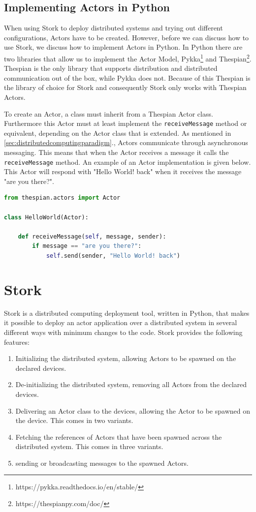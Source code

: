 \documentclass[a4paper]{article}
\newcommand{\secref}[1]{\autoref{#1}.}
\begin{document}
\subsection{Implementing Actors in Python}
When using Stork to deploy distributed systems and trying out different configurations, Actors have to be created. However, before we can discuss how to use Stork, we discuss how to implement Actors in Python. In Python there are two libraries that allow us to implement the Actor Model, Pykka\footnote{https://pykka.readthedocs.io/en/stable/} and Thespian\footnote{https://thespianpy.com/doc/}. Thespian is the only library that supports distribution and distributed communication out of the box, while Pykka does not. Because of this Thespian is the library of choice for Stork and consequently Stork only works with Thespian Actors. 

To create an Actor, a class must inherit from a Thespian Actor class. Furthermore this Actor must at least implement the \lstinline{receiveMessage} method or equivalent, depending on the Actor class that is extended. As mentioned in \secref{sec:distributedcomputingparadigm}, Actors communicate through asynchronous messaging. This means that when the Actor receives a message it calls the \lstinline{receiveMessage} method. An example of an Actor implementation is given below. This Actor will respond with "Hello World! back" when it receives the message "are you there?".
\begin{lstlisting}[language=Python, caption=Actor example, label=lst:actor]
from thespian.actors import Actor

class HelloWorld(Actor):

    def receiveMessage(self, message, sender):
        if message == "are you there?":
            self.send(sender, "Hello World! back")
\end{lstlisting}
\section{Stork}
Stork is a distributed computing deployment tool, written in Python, that makes it possible to deploy an actor application over a distributed system in several different ways with minimum changes to the code. Stork provides the following features:
\begin{enumerate}
    \item Initializing the distributed system, allowing Actors to be spawned on the declared devices.
    \item De-initializing the distributed system, removing all Actors from the declared devices.
    \item Delivering an Actor class to the devices, allowing the Actor to be spawned on the device. This comes in two variants.
    \item Fetching the references of Actors that have been spawned across the distributed system. This comes in three variants.
    \item sending or broadcasting messages to the spawned Actors.
\end{enumerate}
\end{document}
